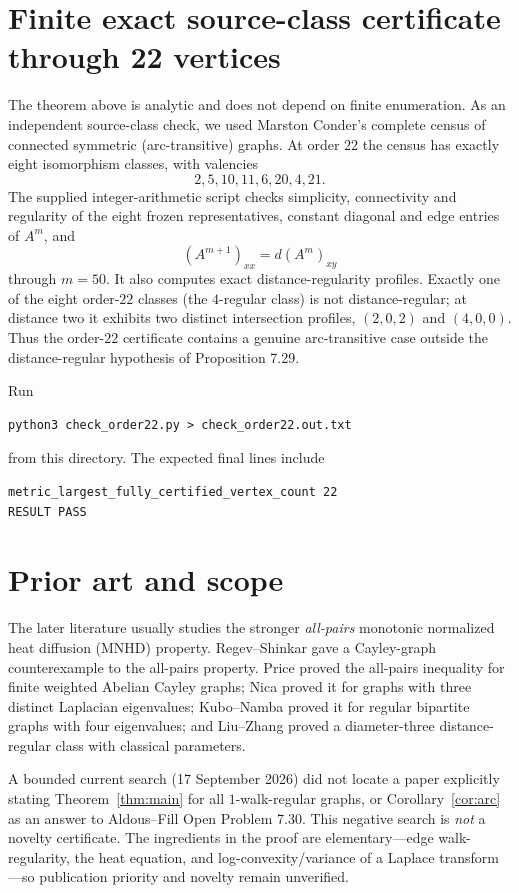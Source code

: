 \documentclass[11pt]{article}
\begin{document}
\section{Finite exact source-class certificate through 22 vertices}
The theorem above is analytic and does not depend on finite enumeration. As an independent source-class check, we used Marston Conder's complete census of connected symmetric (arc-transitive) graphs. At order $22$ the census has exactly eight isomorphism classes, with valencies
\[
2,5,10,11,6,20,4,21.
\]
The supplied integer-arithmetic script checks simplicity, connectivity and regularity of the eight frozen representatives, constant diagonal and edge entries of $A^m$, and
\[
(A^{m+1})_{xx}=d(A^m)_{xy}
\]
through $m=50$. It also computes exact distance-regularity profiles. Exactly one of the eight order-$22$ classes (the $4$-regular class) is not distance-regular; at distance two it exhibits two distinct intersection profiles, $(2,0,2)$ and $(4,0,0)$. Thus the order-$22$ certificate contains a genuine arc-transitive case outside the distance-regular hypothesis of Proposition 7.29.

Run
\begin{verbatim}
python3 check_order22.py > check_order22.out.txt
\end{verbatim}
from this directory. The expected final lines include
\begin{verbatim}
metric_largest_fully_certified_vertex_count 22
RESULT PASS
\end{verbatim}

\section{Prior art and scope}
The later literature usually studies the stronger \emph{all-pairs} monotonic normalized heat diffusion (MNHD) property. Regev--Shinkar gave a Cayley-graph counterexample to the all-pairs property. Price proved the all-pairs inequality for finite weighted Abelian Cayley graphs; Nica proved it for graphs with three distinct Laplacian eigenvalues; Kubo--Namba proved it for regular bipartite graphs with four eigenvalues; and Liu--Zhang proved a diameter-three distance-regular class with classical parameters.

A bounded current search (17 September 2026) did not locate a paper explicitly stating Theorem~\ref{thm:main} for all $1$-walk-regular graphs, or Corollary~\ref{cor:arc} as an answer to Aldous--Fill Open Problem 7.30. This negative search is \emph{not} a novelty certificate. The ingredients in the proof are elementary---edge walk-regularity, the heat equation, and log-convexity/variance of a Laplace transform---so publication priority and novelty remain unverified.
\end{document}

